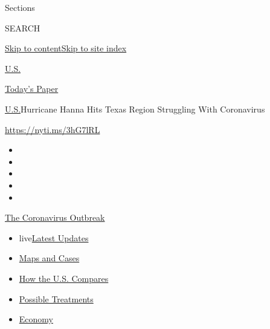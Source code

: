 Sections

SEARCH

\protect\hyperlink{site-content}{Skip to
content}\protect\hyperlink{site-index}{Skip to site index}

\href{https://www.nytimes3xbfgragh.onion/section/us}{U.S.}

\href{https://myaccount.nytimes3xbfgragh.onion/auth/login?response_type=cookie\&client_id=vi}{}

\href{https://www.nytimes3xbfgragh.onion/section/todayspaper}{Today's
Paper}

\href{/section/us}{U.S.}\textbar{}Hurricane Hanna Hits Texas Region
Struggling With Coronavirus

\url{https://nyti.ms/3hG7lRL}

\begin{itemize}
\item
\item
\item
\item
\item
\end{itemize}

\href{https://www.nytimes3xbfgragh.onion/news-event/coronavirus?action=click\&pgtype=Article\&state=default\&module=styln-coronavirus-national\&region=TOP_BANNER\&context=storylines_menu}{The
Coronavirus Outbreak}

\begin{itemize}
\tightlist
\item
  live\href{https://www.nytimes3xbfgragh.onion/2020/07/25/world/coronavirus-covid-19.html?action=click\&pgtype=Article\&state=default\&module=styln-coronavirus-national\&region=TOP_BANNER\&context=storylines_menu}{Latest
  Updates}
\item
  \href{https://www.nytimes3xbfgragh.onion/interactive/2020/us/coronavirus-us-cases.html?action=click\&pgtype=Article\&state=default\&module=styln-coronavirus-national\&region=TOP_BANNER\&context=storylines_menu}{Maps
  and Cases}
\item
  \href{https://www.nytimes3xbfgragh.onion/interactive/2020/07/23/us/coronavirus-hotspots-countries.html?action=click\&pgtype=Article\&state=default\&module=styln-coronavirus-national\&region=TOP_BANNER\&context=storylines_menu}{How
  the U.S. Compares}
\item
  \href{https://www.nytimes3xbfgragh.onion/interactive/2020/science/coronavirus-drugs-treatments.html?action=click\&pgtype=Article\&state=default\&module=styln-coronavirus-national\&region=TOP_BANNER\&context=storylines_menu}{Possible
  Treatments}
\item
  \href{https://www.nytimes3xbfgragh.onion/live/2020/07/24/business/stock-market-updates-coronavirus?action=click\&pgtype=Article\&state=default\&module=styln-coronavirus-national\&region=TOP_BANNER\&context=storylines_menu}{Economy}
\end{itemize}

